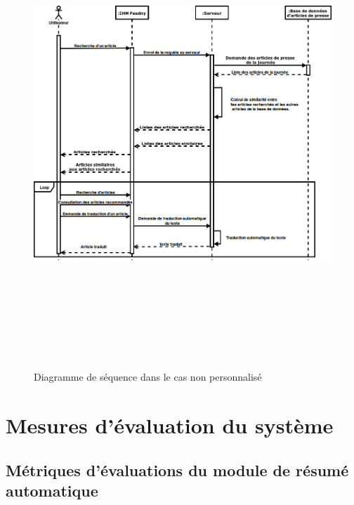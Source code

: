 \begin{figure}[H]
    \centering
    \includegraphics[height=500pt,width=425pt]{img/chapter3/diagseqnonperso.png}
    \caption{Diagramme de séquence dans le cas non personnalisé}
\end{figure}




\section{Mesures d'évaluation du système}

\subsection{Métriques d'évaluations du module de résumé automatique}

